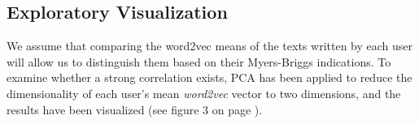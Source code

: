 \documentclass[12pt]{elsarticle}
\begin{document}
\begin{figure}[ht]
\begin{minipage}{0.48\textwidth}
  \centering
\end{minipage}
\begin{minipage}{0.48\textwidth}
  \centering
\end{minipage}
\end{figure}






\subsection{Exploratory Visualization}
We assume that comparing the word2vec means of the texts written by each user will allow us to distinguish them based on their Myers-Briggs indications. To examine whether a strong correlation exists, PCA has been applied to reduce the dimensionality of each user's mean \textit{word2vec} vector to two dimensions, and the results have been visualized (see figure 3 on page \pageref{fig:viz}). 
\end{document}
